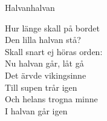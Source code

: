 \begin{song}{Halvan}{halvan}
\begin{vers}
\repopen Hur länge skall på bordet\\
Den lilla halvan stå?\\
Skall snart ej höras orden:\\
Nu halvan går, låt gå \repclose\\
\repopen Det ärvde vikingsinne\\
Till supen trår igen\\
Och helans trogna minne\\
I halvan går igen \repclose\\
\end{vers}
\end{song}
